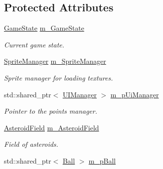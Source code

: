 \subsection*{Protected Attributes}
\begin{DoxyCompactItemize}
\item 
\hypertarget{class_pinball_scene_a33388520907fb2e994252aab123487cc}{\hyperlink{_game_config_8h_a7899b65f1ea0f655e4bbf8d2a5714285}{Game\+State} \hyperlink{class_pinball_scene_a33388520907fb2e994252aab123487cc}{m\+\_\+\+Game\+State}}\label{class_pinball_scene_a33388520907fb2e994252aab123487cc}

\begin{DoxyCompactList}\small\item\em Current game state. \end{DoxyCompactList}\item 
\hypertarget{class_pinball_scene_a620a2dbb8448ff4b9ed9b470e9d0faaa}{\hyperlink{class_sprite_manager}{Sprite\+Manager} \hyperlink{class_pinball_scene_a620a2dbb8448ff4b9ed9b470e9d0faaa}{m\+\_\+\+Sprite\+Manager}}\label{class_pinball_scene_a620a2dbb8448ff4b9ed9b470e9d0faaa}

\begin{DoxyCompactList}\small\item\em Sprite manager for loading textures. \end{DoxyCompactList}\item 
\hypertarget{class_pinball_scene_aec50641fc82974b3edf02d1956098374}{std\+::shared\+\_\+ptr$<$ \hyperlink{class_u_i_manager}{U\+I\+Manager} $>$ \hyperlink{class_pinball_scene_aec50641fc82974b3edf02d1956098374}{m\+\_\+p\+Ui\+Manager}}\label{class_pinball_scene_aec50641fc82974b3edf02d1956098374}

\begin{DoxyCompactList}\small\item\em Pointer to the points manager. \end{DoxyCompactList}\item 
\hypertarget{class_pinball_scene_a0404c72469c589e6b93c38cfb31c747d}{\hyperlink{class_asteroid_field}{Asteroid\+Field} \hyperlink{class_pinball_scene_a0404c72469c589e6b93c38cfb31c747d}{m\+\_\+\+Asteroid\+Field}}\label{class_pinball_scene_a0404c72469c589e6b93c38cfb31c747d}

\begin{DoxyCompactList}\small\item\em Field of asteroids. \end{DoxyCompactList}\item 
\hypertarget{class_pinball_scene_a01c03b087726619b98865047f25e7476}{std\+::shared\+\_\+ptr$<$ \hyperlink{class_ball}{Ball} $>$ \hyperlink{class_pinball_scene_a01c03b087726619b98865047f25e7476}{m\+\_\+p\+Ball}}\label{class_pinball_scene_a01c03b087726619b98865047f25e7476}


\end{DoxyCompactItemize}
